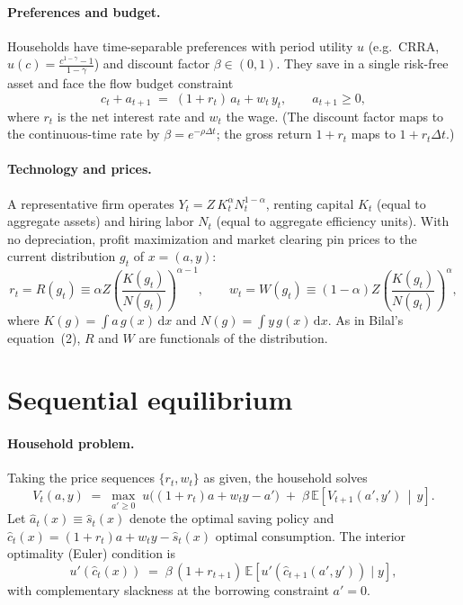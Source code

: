 \documentclass[11pt]{article}
\newcommand{\E}{\mathbb{E}}
\newcommand{\dd}{\,\mathrm{d}}
\begin{document}
\paragraph{Preferences and budget.}
Households have time-separable preferences with period utility $u$ (e.g.\ CRRA,
$u(c)=\tfrac{c^{1-\gamma}-1}{1-\gamma}$) and discount factor $\beta\in(0,1)$. They
save in a single risk-free asset and face the flow budget constraint
\begin{equation}\label{eq:budget}
  c_t + a_{t+1} \;=\; (1+r_t)\,a_t + w_t\,y_t,
  \qquad a_{t+1}\ge 0,
\end{equation}
where $r_t$ is the net interest rate and $w_t$ the wage. (The discount factor maps
to the continuous-time rate by $\beta=e^{-\rho\Delta t}$; the gross return
$1+r_t$ maps to $1+r_t\Delta t$.)

\paragraph{Technology and prices.}
A representative firm operates $Y_t=Z\,K_t^{\alpha}N_t^{1-\alpha}$, renting capital
$K_t$ (equal to aggregate assets) and hiring labor $N_t$ (equal to aggregate
efficiency units). With no depreciation, profit maximization and market clearing
pin prices to the current distribution $g_t$ of $x=(a,y)$:
\begin{equation}\label{eq:prices}
  r_t = R(g_t)\equiv \alpha Z\!\left(\frac{K(g_t)}{N(g_t)}\right)^{\alpha-1},
  \qquad
  w_t = W(g_t)\equiv (1-\alpha)Z\!\left(\frac{K(g_t)}{N(g_t)}\right)^{\alpha},
\end{equation}
where $K(g)=\int a\,g(x)\dd x$ and $N(g)=\int y\,g(x)\dd x$. As in Bilal's
equation~(2), $R$ and $W$ are functionals of the distribution.

\section{Sequential equilibrium}

\paragraph{Household problem.}
Taking the price sequences $\{r_t,w_t\}$ as given, the household solves
\begin{equation}\label{eq:seq-bellman}
  V_t(a,y) \;=\; \max_{a'\ge 0}\;
  u\!\big((1+r_t)a + w_t y - a'\big)
  \;+\; \beta\,\E\!\left[V_{t+1}(a',y')\,\middle|\,y\right].
\end{equation}
Let $\hat a_{t}(x)\equiv \hat s_t(x)$ denote the optimal saving policy and
$\hat c_t(x)=(1+r_t)a+w_ty-\hat s_t(x)$ optimal consumption. The interior
optimality (Euler) condition is
\begin{equation}\label{eq:euler}
  u'(\hat c_t(x))\;=\;\beta\,(1+r_{t+1})\,\E\!\left[u'(\hat c_{t+1}(a',y'))\mid y\right],
\end{equation}
with complementary slackness at the borrowing constraint $a'=0$.
\end{document}
